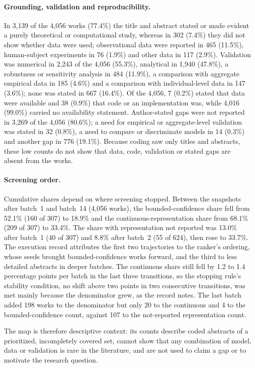 \paragraph{Grounding, validation and reproducibility.}
In 3,139 of the 4,056 works (77.4\%) the title and abstract stated or made evident a purely theoretical or computational study, whereas in 302 (7.4\%) they did not show whether data were used; observational data were reported in 465 (11.5\%), human-subject experiments in 76 (1.9\%) and other data in 117 (2.9\%). %
Validation was numerical in 2,243 of the 4,056 (55.3\%), analytical in 1,940 (47.8\%), a robustness or sensitivity analysis in 484 (11.9\%), a comparison with aggregate empirical data in 185 (4.6\%) and a comparison with individual-level data in 147 (3.6\%); none was stated in 667 (16.4\%). %
Of the 4,056, 7 (0.2\%) stated that data were available and 38 (0.9\%) that code or an implementation was, while 4,016 (99.0\%) carried no availability statement. %
Author-stated gaps were not reported in 3,269 of the 4,056 (80.6\%); a need for empirical or aggregate-level validation was stated in 32 (0.8\%), a need to compare or discriminate models in 14 (0.3\%) and another gap in 776 (19.1\%). %
Because coding saw only titles and abstracts, these low counts do not show that data, code, validation or stated gaps are absent from the works. %

\paragraph{Screening order.}
Cumulative shares depend on where screening stopped. %
Between the snapshots after batch~1 and batch~14 (4,056 works), the bounded-confidence share fell from 52.1\% (160 of 307) to 18.9\% and the continuous-representation share from 68.1\% (209 of 307) to 33.4\%. %
The share with representation not reported was 13.0\% after batch~1 (40 of 307) and 8.8\% after batch~2 (55 of 624), then rose to 33.7\%. %
The execution record attributes the first two trajectories to the ranker's ordering, whose seeds brought bounded-confidence works forward, and the third to less detailed abstracts in deeper batches. %
The continuous share still fell by 1.2 to 1.4 percentage points per batch in the last three transitions, so the stopping rule's stability condition, no shift above two points in two consecutive transitions, was met mainly because the denominator grew, as the record notes. %
The last batch added 198 works to the denominator but only 20 to the continuous and 4 to the bounded-confidence count, against 107 to the not-reported representation count. %

The map is therefore descriptive context: its counts describe coded abstracts of a prioritized, incompletely covered set, cannot show that any combination of model, data or validation is rare in the literature, and are not used to claim a gap or to motivate the research question. %

